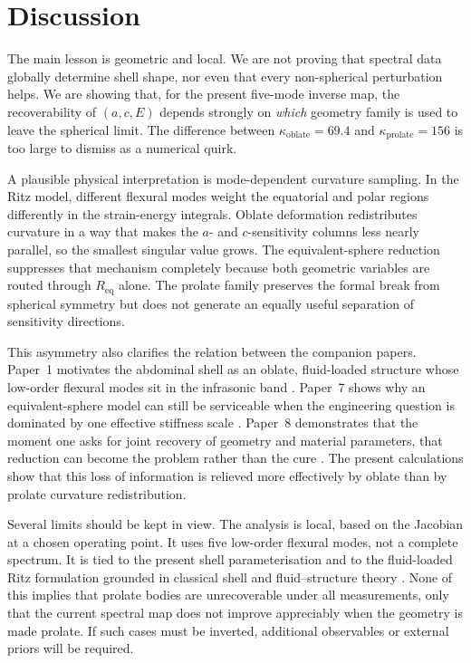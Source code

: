 \section{Discussion}

The main lesson is geometric and local.  We are not proving that spectral data
globally determine shell shape, nor even that every non-spherical perturbation
helps.  We are showing that, for the present five-mode inverse map, the
recoverability of $(a,c,E)$ depends strongly on \emph{which} geometry family is
used to leave the spherical limit.  The difference between
$\kappa_\mathrm{oblate}=\num{69.4}$ and $\kappa_\mathrm{prolate}=156$ is too
large to dismiss as a numerical quirk.

A plausible physical interpretation is mode-dependent curvature sampling.  In the Ritz
model, different flexural modes weight the equatorial and polar regions
differently in the strain-energy integrals.  Oblate deformation redistributes
curvature in a way that makes the $a$- and $c$-sensitivity columns less nearly
parallel, so the smallest singular value grows.  The equivalent-sphere reduction
suppresses that mechanism completely because both geometric variables are routed
through $R_\mathrm{eq}$ alone.  The prolate family preserves the formal break
from spherical symmetry but does not generate an equally useful separation of
sensitivity directions.

This asymmetry also clarifies the relation between the companion papers.
Paper~1 motivates the abdominal shell as an oblate, fluid-loaded structure whose
low-order flexural modes sit in the infrasonic band \cite{BrowntoneP1}.  Paper~7
shows why an equivalent-sphere model can still be serviceable when the
engineering question is dominated by one effective stiffness scale
\cite{BrowntoneP7}.  Paper~8 demonstrates that the moment one asks for joint
recovery of geometry and material parameters, that reduction can become the
problem rather than the cure \cite{BrowntoneP8}.  The present calculations show
that this loss of information is relieved more effectively by oblate than by
prolate curvature redistribution.

Several limits should be kept in view.  The analysis is local, based on the
Jacobian at a chosen operating point.  It uses five low-order flexural modes,
not a complete spectrum.  It is tied to the present shell parameterisation and
to the fluid-loaded Ritz formulation grounded in classical shell and
fluid--structure theory \cite{Lamb1882,JungerFeit1986}.  None of this implies
that prolate bodies are unrecoverable under all measurements, only that the
current spectral map does not improve appreciably when the geometry is made
prolate.  If such cases must be inverted, additional observables or external
priors will be required.
